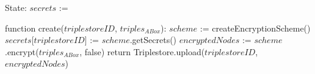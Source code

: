 State:
    $secrets$ := {}

function create($triplestoreID$, $triples_{ABox}$):
    $scheme$ := createEncryptionScheme() 
    $secrets$[$triplestoreID$] := $scheme$.getSecrets()
    $encryptedNodes$ := $scheme$.encrypt($triples_{ABox}$, false)
    return Triplestore.upload($triplestoreID$, $encryptedNodes$)